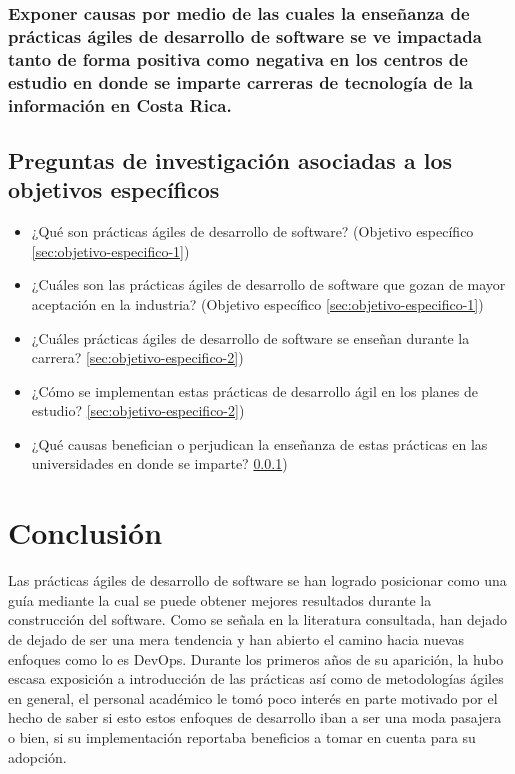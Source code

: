 \documentclass[journal]{IEEEtran}
\begin{document}
\subsubsection{Exponer causas por medio de las cuales la enseñanza de prácticas ágiles de desarrollo de software se ve impactada tanto de forma positiva como negativa en los centros de estudio en donde se imparte carreras de tecnología de la información en Costa Rica.} \label{sec:objetivo-especifico-3}

\subsection{Preguntas de investigación asociadas a los objetivos específicos}
\begin{itemize}
    \item ¿Qué son prácticas ágiles de desarrollo de software? (Objetivo específico \ref{sec:objetivo-especifico-1})
    \item ¿Cuáles son las prácticas ágiles de desarrollo de software que gozan de mayor aceptación en la industria? (Objetivo específico \ref{sec:objetivo-especifico-1})
    \item ¿Cuáles prácticas ágiles de desarrollo de software se enseñan durante la carrera? \ref{sec:objetivo-especifico-2})
    \item ¿Cómo se implementan estas prácticas de desarrollo ágil en los planes de estudio? \ref{sec:objetivo-especifico-2})
    \item ¿Qué causas benefician o perjudican la enseñanza de estas prácticas en las universidades en donde se imparte? \ref{sec:objetivo-especifico-3})
\end{itemize}


\section{Conclusión} \label{sec:conclusion}
Las prácticas ágiles de desarrollo de software se han logrado posicionar como una guía mediante la cual se puede obtener mejores resultados durante la construcción del software. Como se señala en la literatura consultada, han dejado de dejado de ser una mera tendencia y han abierto el camino hacia nuevas enfoques como lo es DevOps. Durante los primeros años de su aparición, la hubo escasa exposición a introducción de las prácticas así como de metodologías ágiles en general, el personal académico le tomó poco interés en parte motivado por el hecho de saber si esto estos enfoques de desarrollo iban a ser una moda pasajera o bien, si su implementación reportaba beneficios a tomar en cuenta para su adopción.
\end{document}
